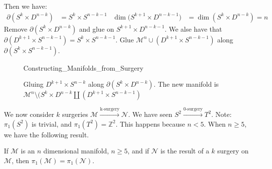 \documentclass[crop=false,class=article,oneside]{standalone}
\begin{document}
            Then we have:
            \begin{align*}
                \partial(S^{k}\times {D^{n-k}})
                &=S^{k}\times{S^{n-k-1}}
                &
                \dim(S^{k+1}\times{D^{n-k-1})}
                &=\dim(S^{k}\times{D^{n-k}})=n
            \end{align*}
            Remove $\partial(S^{k}\times{D^{n-k}})$ and
            glue on $S^{k+1}\times{D}^{n-k-1}$.
            We alse have that
            $\partial(D^{k+1}\times{S^{n-k-1}})%
             =S^{k}\times{S^{n-k-1}}$.
            Glue $\mathcal{M}^{n}\cup(D^{k+1}\times S^{n-k-1})$
            along $\partial(S^{k}\times{S^{n-k-1}})$.
            \begin{figure}[H]
                \centering
                \captionsetup{type=figure}
                
                          {Constructing_Manifolds_from_Surgery}
                \caption[More Complicated Surgery Example.]
                        {Gluing $D^{k+1}\times S^{n-k}$ along
                         $\partial(S^{k}\times D^{n-k})$. The new
                         manifold is
                         $\mathcal{M}^{n}\setminus(S^{k}\times%
                          D^{n-k}\coprod(D^{k+1}\times S^{n-k-1})$}
                \label{fig:surgery_theory_glueing_S_k_D_n_k_to_M}
            \end{figure}
            We now consider $k$ surgeries
            $\mathcal{M}%
             \overset{\textrm{k-surgery}}{\longrightarrow}%
             \mathcal{N}$.
            We have seen
            $S^{2}%
             \overset{\textrm{0-surgery}}{\longrightarrow}
             T^{2}$.
            Note: $\pi_{1}(S^{2})$ is trivial,
            and $\pi_{1}(T^{2})=\mathbb{Z}^{2}$.
            This happens because $n<5$. When $n\geq{5}$,
            we have the following result.
            \begin{theorem}
                If $\mathcal{M}$ is an $n$ dimensional manifold,
                $n\geq{5}$, and if $\mathcal{N}$ is the result of
                a $k$ surgery on $\mathcal{M}$, then
                $\pi_{1}(\mathcal{M})=\pi_{1}(\mathcal{N})$.
            \end{theorem}
\end{document}
